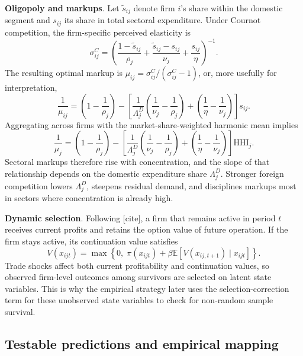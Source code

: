\documentclass[12pt]{article}
\newcommand{\textcite}[2][]{[cite]}
\begin{document}
\textbf{Oligopoly and markups}. Let $\tilde{s}_{ij}$ denote firm $i$'s share within the domestic segment and $s_{ij}$ its share in total sectoral expenditure. Under Cournot competition, the firm-specific perceived elasticity is
\[
\sigma_{ij}^C =
\left(
\frac{1-\tilde{s}_{ij}}{\rho_j}
+
\frac{\tilde{s}_{ij}-s_{ij}}{\nu_j}
+
\frac{s_{ij}}{\eta}
\right)^{-1}.
\]
The resulting optimal markup is $\mu_{ij} = \sigma_{ij}^C / (\sigma_{ij}^C-1)$, or, more usefully for interpretation,
\begin{equation}
\frac{1}{\mu_{ij}} =
\left(1-\frac{1}{\rho_j}\right)
-
\left[
\frac{1}{\Lambda_j^D}\left(\frac{1}{\nu_j}-\frac{1}{\rho_j}\right)
+
\left(\frac{1}{\eta}-\frac{1}{\nu_j}\right)
\right] s_{ij}.
\label{eq:firm_inverse_markup}
\end{equation}
Aggregating across firms with the market-share-weighted harmonic mean implies
\begin{equation}
\frac{1}{\mu_j} =
\left(1-\frac{1}{\rho_j}\right)
-
\left[
\frac{1}{\Lambda_j^D}\left(\frac{1}{\nu_j}-\frac{1}{\rho_j}\right)
+
\left(\frac{1}{\eta}-\frac{1}{\nu_j}\right)
\right] \text{HHI}_j.
\label{eq:sector_inverse_markup}
\end{equation}
Sectoral markups therefore rise with concentration, and the slope of that relationship depends on the domestic expenditure share $\Lambda_j^D$. Stronger foreign competition lowers $\Lambda_j^D$, steepens residual demand, and disciplines markups most in sectors where concentration is already high.

\textbf{Dynamic selection}. Following \textcite{golombekExitDynamicsStartup2018}, a firm that remains active in period $t$ receives current profits and retains the option value of future operation. If the firm stays active, its continuation value satisfies
\[
V(x_{ijt}) = \max \left\{0,\; \pi(x_{ijt}) + \beta \mathbb{E}[V(x_{ij,t+1}) \mid x_{ijt}] \right\}.
\]
Trade shocks affect both current profitability and continuation values, so observed firm-level outcomes among survivors are selected on latent state variables. This is why the empirical strategy later uses the selection-correction term for these unobserved state variables to check for non-random sample survival.

\subsection{Testable predictions and empirical mapping}
\end{document}
